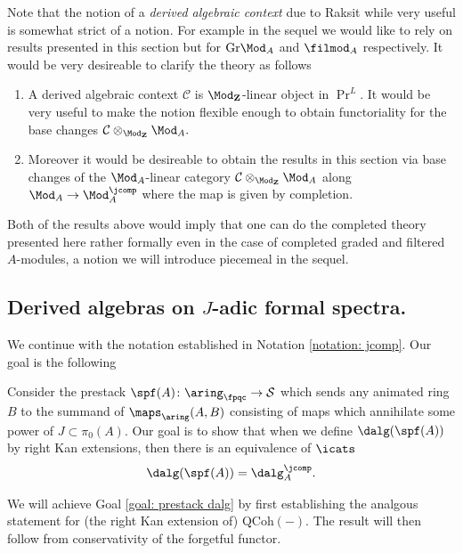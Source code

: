 \documentclass[10pt,reqno]{amsart}
\numberwithin{equation}{section}
\newcommand{\cC}{\mathcal{C}}
\newcommand{\ZZ}{\mathbf{Z}}
\newcommand{\Qcoh}{\mathrm{QCoh}}
\newcommand{\Gr}{\mathrm{Gr}}
\begin{document}
\begin{remark}\label{remark: base changes for contexts.}
Note that the notion of a \emph{derived algebraic context} due to Raksit \cite[Defintion 4.2.1]{Rak20} while very useful is somewhat strict of a notion. For example in the sequel we would like to rely on results presented in this section but for $\Gr\Mod_A$ and $\filmod_A$ respectively. It would be very desireable to clarify the theory as follows
\begin{enumerate}
    \item A derived algebraic context $\cC$ is $\Mod_\ZZ$-linear object in $\Pr^L$. It would be very useful to make the notion flexible enough to obtain functoriality for the base changes $\cC\otimes_{\Mod_\ZZ}\Mod_A.$
    \item Moreover it would be desireable to obtain the results in this section via base changes of the $\Mod_A$-linear category $\cC\otimes_{\Mod_\ZZ}\Mod_A$ along $\Mod_A\to \Mod_A^\jcomp$ where the map is given by completion. 
\end{enumerate}
Both of the results above would imply that one can do the completed theory presented here rather formally even in the case of completed graded and filtered $A$-modules, a notion we will introduce piecemeal in the sequel.
\end{remark}

\subsection{Derived algebras on $J$-adic formal spectra.}

We continue with the notation established in Notation \ref{notation: jcomp}.
Our goal is the following

\begin{goal}\label{goal: prestack dalg}
    Consider the prestack $\spf(A)\colon \aring_\fpqc \to \mathcal{S}$ which sends any animated ring $B$ to the summand of $\maps_{\aring}(A,B)$ consisting of maps which annihilate some power of $J\subset \pi_0(A)$. 
    Our goal is to show that when we define $\dalg(\spf(A))$ by right Kan extensions, then there is an equivalence of $\icats$
    $$\dalg(\spf(A))=\dalg_{A}^\jcomp.$$
\end{goal}


We will achieve Goal \ref{goal: prestack dalg} by first establishing the analgous statement for (the right Kan extension of) $\Qcoh(-)$. The result will then follow from conservativity of the forgetful functor.
\end{document}
